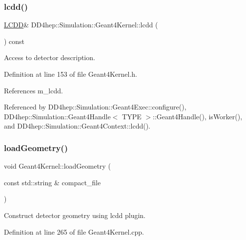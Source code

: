 \subsubsection{\texorpdfstring{lcdd()}{lcdd()}}
{\footnotesize\ttfamily \hyperlink{class_d_d4hep_1_1_simulation_1_1_geant4_kernel_a190e652b62ebce3db3372c4265ffa5a3}{L\+C\+DD}\& D\+D4hep\+::\+Simulation\+::\+Geant4\+Kernel\+::lcdd (\begin{DoxyParamCaption}{ }\end{DoxyParamCaption}) const\hspace{0.3cm}{\ttfamily [inline]}}



Access to detector description. 



Definition at line 153 of file Geant4\+Kernel.\+h.



References m\+\_\+lcdd.



Referenced by D\+D4hep\+::\+Simulation\+::\+Geant4\+Exec\+::configure(), D\+D4hep\+::\+Simulation\+::\+Geant4\+Handle$<$ T\+Y\+P\+E $>$\+::\+Geant4\+Handle(), is\+Worker(), and D\+D4hep\+::\+Simulation\+::\+Geant4\+Context\+::lcdd().

\hypertarget{class_d_d4hep_1_1_simulation_1_1_geant4_kernel_afe27ed5e3415cd381df461a28015ff81}{}\label{class_d_d4hep_1_1_simulation_1_1_geant4_kernel_afe27ed5e3415cd381df461a28015ff81} 
\subsubsection{\texorpdfstring{load\+Geometry()}{loadGeometry()}}
{\footnotesize\ttfamily void Geant4\+Kernel\+::load\+Geometry (\begin{DoxyParamCaption}\item[{const std\+::string \&}]{compact\+\_\+file }\end{DoxyParamCaption})\hspace{0.3cm}{\ttfamily [virtual]}}



Construct detector geometry using lcdd plugin. 



Definition at line 265 of file Geant4\+Kernel.\+cpp.



